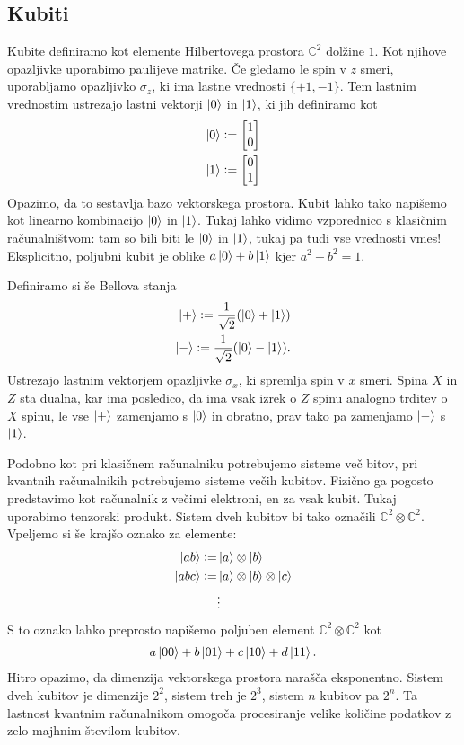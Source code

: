 \documentclass[mat1]{fmfdelo}
\newcommand{\defeq}{\vcentcolon=}
\begin{document}
\subsection{Kubiti}
Kubite definiramo kot elemente Hilbertovega prostora \(\mathbb C^2\) dolžine \(1\). Kot njihove opazljivke uporabimo paulijeve matrike. Če gledamo le spin v \(z\) smeri, uporabljamo opazljivko \(\sigma_z\), ki ima lastne vrednosti \(\{+1, -1\}\). Tem lastnim vrednostim ustrezajo lastni vektorji \(\ket0\) in \(\ket1\), ki jih definiramo kot
\begin{align*}
    \ket0 \defeq \begin{bmatrix}
        1\\0
    \end{bmatrix}\\
    \ket1 \defeq \begin{bmatrix}
        0\\1
    \end{bmatrix}
\end{align*}
Opazimo, da to sestavlja bazo vektorskega prostora. Kubit lahko tako napišemo kot linearno kombinacijo \(\ket0\) in \(\ket1\). Tukaj lahko vidimo vzporednico s klasičnim računalništvom: tam so bili biti le \(\ket0\) in \(\ket1\), tukaj pa tudi vse vrednosti vmes! Eksplicitno, poljubni kubit je oblike \(a\ket0+b\ket1\) kjer \(a^2+b^2=1\).

Definiramo si še Bellova stanja
\begin{align*}
    \ket{+} \defeq \frac{1}{\sqrt2} (\ket0+\ket1)\\
    \ket{-} \defeq \frac{1}{\sqrt2} (\ket0-\ket1).
\end{align*}
Ustrezajo lastnim vektorjem opazljivke \(\sigma_x\), ki spremlja spin v \(x\) smeri. Spina \(X\) in \(Z\) sta dualna, kar ima posledico, da ima vsak izrek o \(Z\) spinu analogno trditev o \(X\) spinu, le vse \(\ket+\) zamenjamo s \(\ket0\) in obratno, prav tako pa zamenjamo \(\ket-\) s \(\ket1\).

Podobno kot pri klasičnem računalniku potrebujemo sisteme več bitov, pri kvantnih računalnikih potrebujemo sisteme večih kubitov. Fizično ga pogosto predstavimo kot računalnik z večimi elektroni, en za vsak kubit. Tukaj uporabimo tenzorski produkt. Sistem dveh kubitov bi tako označili \(\mathbb C^2 \otimes \mathbb C^2\). Vpeljemo si še krajšo oznako za elemente:
\begin{align*}
    \ket{ab} \defeq& \ket{a}\otimes\ket{b}\\
    \ket{abc} \defeq& \ket{a}\otimes\ket{b}\otimes\ket{c}\\
    &\vdots
\end{align*}
S to oznako lahko preprosto napišemo poljuben element \(\mathbb C^2 \otimes \mathbb C^2\) kot
\begin{align*}
    a\ket{00} + b\ket{01} + c\ket{10} + d\ket{11}.
\end{align*}
Hitro opazimo, da dimenzija vektorskega prostora narašča eksponentno. Sistem dveh kubitov je dimenzije \(2^2\), sistem treh je \(2^3\), sistem \(n\) kubitov pa \(2^n\). Ta lastnost kvantnim računalnikom omogoča procesiranje velike količine podatkov z zelo majhnim številom kubitov.
\end{document}
